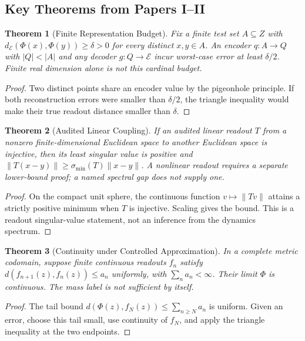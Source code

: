 \documentclass[11pt,a4paper]{article}
\theoremstyle{plain}
\newtheorem{theorem}{Theorem}[section]
\theoremstyle{definition}
\theoremstyle{remark}
\newcommand{\E}{\mathcal{E}}
\newcommand{\dE}{d_{\mathcal{E}}}
\begin{document}
\subsection{Key Theorems from Papers I--II}

\begin{theorem}[Finite Representation Budget]\label{thm:nonsim}
Fix a finite test set $A\subseteq Z$ with $\dE(\Phi(x),\Phi(y))\geq\delta>0$ for every distinct $x,y\in A$. An encoder $q:A\to Q$ with $|Q|<|A|$ and any decoder $g:Q\to\E$ incur worst-case error at least $\delta/2$. Finite real dimension alone is not this cardinal budget.
\end{theorem}

\begin{proof}
Two distinct points share an encoder value by the pigeonhole principle. If both reconstruction errors were smaller than $\delta/2$, the triangle inequality would make their true readout distance smaller than $\delta$.
\end{proof}

\begin{theorem}[Audited Linear Coupling]\label{thm:spectral}
If an audited linear readout $T$ from a nonzero finite-dimensional Euclidean space to another Euclidean space is injective, then its least singular value is positive and $\|T(x-y)\|\geq\sigma_{\min}(T)\|x-y\|$. A nonlinear readout requires a separate lower-bound proof; a named spectral gap does not supply one.
\end{theorem}

\begin{proof}
On the compact unit sphere, the continuous function $v\mapsto\|Tv\|$ attains a strictly positive minimum when $T$ is injective. Scaling gives the bound. This is a readout singular-value statement, not an inference from the dynamics spectrum.
\end{proof}

\begin{theorem}[Continuity under Controlled Approximation]\label{thm:cont}
In a complete metric codomain, suppose finite continuous readouts $f_n$ satisfy $d(f_{n+1}(z),f_n(z))\leq a_n$ uniformly, with $\sum_n a_n<\infty$. Their limit $\Phi$ is continuous. The mass label is not sufficient by itself.
\end{theorem}

\begin{proof}
The tail bound $d(\Phi(z),f_N(z))\leq\sum_{n\geq N}a_n$ is uniform. Given an error, choose this tail small, use continuity of $f_N$, and apply the triangle inequality at the two endpoints.
\end{proof}
\end{document}
